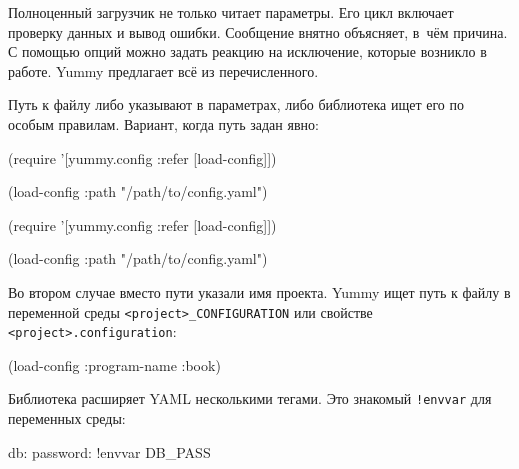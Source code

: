 Полноценный загрузчик не только читает параметры. Его цикл включает проверку данных
и вывод ошибки. Сообщение внятно объясняет, в~чём причина. С помощью опций можно
задать реакцию на исключение, которые возникло в работе. Yummy предлагает всё из
перечисленного.

Путь к файлу либо указывают в параметрах, либо библиотека ищет его по особым
правилам. Вариант, когда путь задан явно:

\ifnarrow

\begin{english}
  \begin{clojure}
(require
  '[yummy.config :refer [load-config]])

(load-config
  {:path "/path/to/config.yaml"})
  \end{clojure}
\end{english}

\else

\begin{english}
  \begin{clojure}
(require '[yummy.config :refer [load-config]])

(load-config {:path "/path/to/config.yaml"})
  \end{clojure}
\end{english}

\fi

Во втором случае вместо пути указали имя проекта. Yummy ищет путь к файлу в
переменной среды \verb|<project>_CONFIGURATION| или свойстве
\verb|<project>.configuration|:

\begin{english}
\end{english}

\ifafive\vspace{-5mm}\fi

\begin{english}
  \begin{clojure}
(load-config {:program-name :book})
  \end{clojure}
\end{english}

Библиотека расширяет YAML несколькими тегами. Это знакомый \verb|!envvar|
для переменных среды:


\begin{english}
  \begin{yaml}
db:
  password: !envvar DB_PASS
  \end{yaml}
\end{english}

